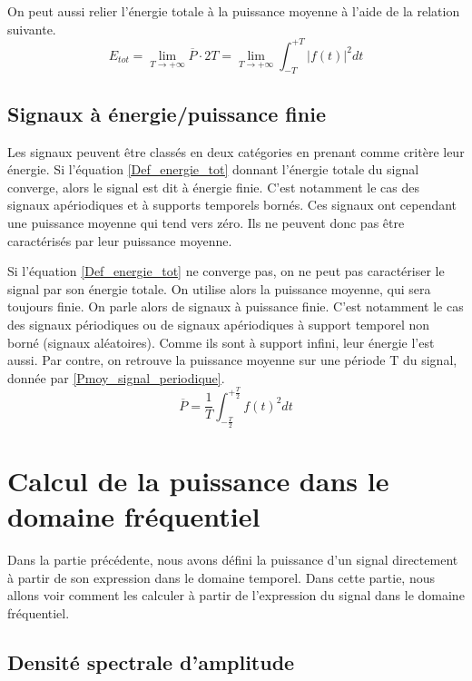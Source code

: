 	On peut aussi relier l'énergie totale à la puissance moyenne à l'aide de la relation suivante.
	\begin{equation}\label{key}
	E_{tot}= \lim_{T \to +\infty}\overline{P} \cdot 2T=\lim_{T \to +\infty}\int_{-T}^{+T}|f(t)|^{2}dt
	\end{equation}
	
	
	\subsection{Signaux à énergie/puissance finie}
	Les signaux peuvent être classés en deux catégories en prenant comme critère leur énergie. Si l'équation \ref{Def_energie_tot} donnant l'énergie totale du signal converge, alors le signal est dit à énergie finie. C'est notamment le cas des signaux apériodiques et à supports temporels bornés. Ces signaux ont cependant une puissance moyenne qui tend vers zéro. Ils ne peuvent donc pas être caractérisés par leur puissance moyenne.
	
	Si l'équation \ref{Def_energie_tot} ne converge pas, on ne peut pas caractériser le signal par son énergie totale. On utilise alors la puissance moyenne, qui sera toujours finie. On parle alors de signaux à puissance finie. C'est notamment le cas des signaux périodiques ou de signaux apériodiques à support temporel non borné (signaux aléatoires). Comme ils sont à support infini, leur énergie l'est aussi. Par contre, on retrouve la puissance moyenne sur une période T du signal, donnée par \ref{Pmoy_signal_periodique}. 
	\begin{equation}\label{Pmoy_signal_periodique}
	\overline{P}=\frac{1}{T}\int_{-\frac{T}{2}}^{+\frac{T}{2}}f(t)^{2}dt
	\end{equation}
	
	

	
	\section{Calcul de la puissance dans le domaine fréquentiel}
	
	Dans la partie précédente, nous avons défini la puissance d'un signal directement à partir de son expression dans le domaine temporel. Dans cette partie, nous allons voir comment les calculer à partir de l'expression du signal dans le domaine fréquentiel. 
	
	\subsection{Densité spectrale d'amplitude}
	
